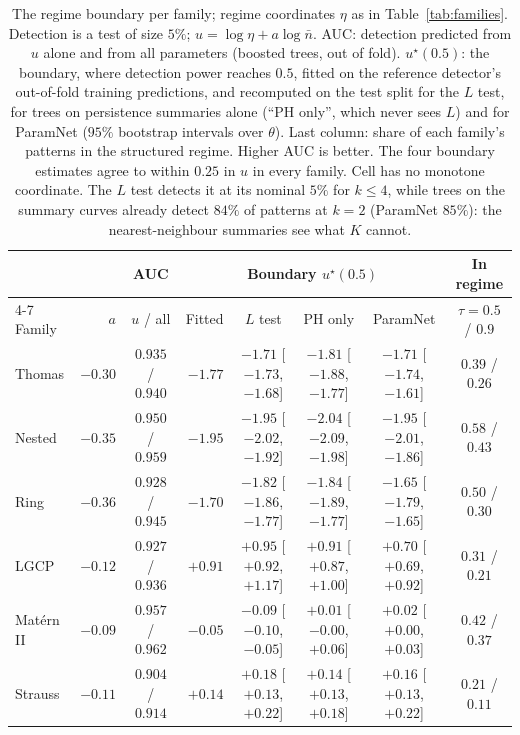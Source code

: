 \documentclass[twoside]{article}
\newcommand{\nb}{\bar n}
\begin{document}
\begin{table}[t]
\caption{The regime boundary per family; regime coordinates $\eta$ as in Table~\ref{tab:families}. Detection is a
test of size $5\%$; $u=\log\eta+a\log\nb$. AUC: detection predicted from $u$ alone and from all parameters (boosted
trees, out of fold). $u^\star(0.5)$: the boundary, where detection power reaches $0.5$, fitted on the reference
detector's out-of-fold training predictions, and recomputed on the test split for the $L$ test, for trees on
persistence summaries alone (``PH only'', which never sees $L$) and for ParamNet ($95\%$ bootstrap intervals over
$\theta$). Last column: share of each family's patterns in the structured regime. Higher AUC is better. The four
boundary estimates agree to within $0.25$ in $u$ in every family. Cell has no monotone coordinate. The $L$ test
detects it at its nominal $5\%$ for $k\le4$, while trees on the summary curves already detect $84\%$ of patterns at
$k=2$ (ParamNet $85\%$): the nearest-neighbour summaries see what $K$ cannot.}
\label{tab:regime}
\begin{center}
\footnotesize
\setlength{\tabcolsep}{4pt}
\begin{tabular}{@{}lrcrcccc@{}}
\toprule
& & AUC & \multicolumn{4}{c}{Boundary $u^\star(0.5)$} & In regime \\
\cmidrule(lr){4-7}
Family & $a$ & $u$ / all & Fitted & $L$ test & PH only & ParamNet & $\tau=0.5$ / $0.9$ \\
\midrule
Thomas      & $-0.30$ & $0.935$ / $0.940$ & $-1.77$ & $-1.71$ {\scriptsize[$-1.73$, $-1.68$]} & $-1.81$ {\scriptsize[$-1.88$, $-1.77$]} & $-1.71$ {\scriptsize[$-1.74$, $-1.61$]} & $0.39$ / $0.26$ \\
Nested      & $-0.35$ & $0.950$ / $0.959$ & $-1.95$ & $-1.95$ {\scriptsize[$-2.02$, $-1.92$]} & $-2.04$ {\scriptsize[$-2.09$, $-1.98$]} & $-1.95$ {\scriptsize[$-2.01$, $-1.86$]} & $0.58$ / $0.43$ \\
Ring        & $-0.36$ & $0.928$ / $0.945$ & $-1.70$ & $-1.82$ {\scriptsize[$-1.86$, $-1.77$]} & $-1.84$ {\scriptsize[$-1.89$, $-1.77$]} & $-1.65$ {\scriptsize[$-1.79$, $-1.65$]} & $0.50$ / $0.30$ \\
LGCP        & $-0.12$ & $0.927$ / $0.936$ & $+0.91$ & $+0.95$ {\scriptsize[$+0.92$, $+1.17$]} & $+0.91$ {\scriptsize[$+0.87$, $+1.00$]} & $+0.70$ {\scriptsize[$+0.69$, $+0.92$]} & $0.31$ / $0.21$ \\
Mat\'ern II & $-0.09$ & $0.957$ / $0.962$ & $-0.05$ & $-0.09$ {\scriptsize[$-0.10$, $-0.05$]} & $+0.01$ {\scriptsize[$-0.00$, $+0.06$]} & $+0.02$ {\scriptsize[$+0.00$, $+0.03$]} & $0.42$ / $0.37$ \\
Strauss     & $-0.11$ & $0.904$ / $0.914$ & $+0.14$ & $+0.18$ {\scriptsize[$+0.13$, $+0.22$]} & $+0.14$ {\scriptsize[$+0.13$, $+0.18$]} & $+0.16$ {\scriptsize[$+0.13$, $+0.22$]} & $0.21$ / $0.11$ \\
\bottomrule
\end{tabular}
\end{center}
\end{table}
\end{document}
